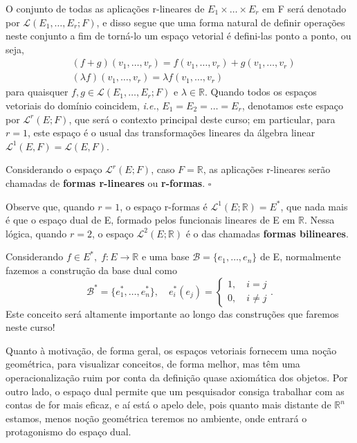 \documentclass[../differential_forms.tex]{subfiles}
\begin{document}
O conjunto de todas as aplicações r-lineares de \(E_1 \times \dotsc \times E_r\) em F será denotado por \(\mathcal{L}(E_1, \dotsc , E_r; F)\), e disso segue que uma forma natural de definir operações neste conjunto a fim de torná-lo um espaço vetorial é defini-las ponto a ponto, ou seja,
\begin{align*}
	 & (f+g)(v_1, \dotsc , v_r) = f(v_1, \dotsc , v_r) + g(v_1, \dotsc , v_r) \\
	 & (\lambda f)(v_1, \dotsc , v_r) = \lambda f(v_1,\dotsc ,v_r)
\end{align*}
para quaisquer \(f, g\in \mathcal{L}(E_1, \dotsc , E_r; F)\) e \(\lambda \in \mathbb{R}.\) Quando todos os espaços vetoriais do domínio coincidem, \textit{i.e.}, \(E_1= E_2=\dotsc=E_r\), denotamos este espaço por \(\mathcal{L}^{r}(E; F)\), que será o contexto principal deste curso; em particular, para \(r=1\), este espaço é o usual das transformações lineares da álgebra linear \(\mathcal{L}^{1}(E, F) = \mathcal{L}(E, F)\).
\begin{def*}
	Considerando o espaço \(\mathcal{L}^{r}(E; F)\), caso \(F = \mathbb{R}\), as aplicações r-lineares serão chamadas de \textbf{formas r-lineares} ou \textbf{r-formas}. \(\square\)
\end{def*}
Observe que, quando \(r=1\), o espaço r-formas é \(\mathcal{L}^{1}(E; \mathbb{R}) = E^{*}\), que nada mais é que o espaço dual de E, formado pelos funcionais lineares de E em \(\mathbb{R}\). Nessa lógica, quando \(r=2\), o espaço \(\mathcal{L}^{2}(E; \mathbb{R})\) é o das chamadas \textbf{formas bilineares}.
\begin{tcolorbox}[
		skin=enhanced,
		title=Observação,
		fonttitle=\bfseries,
		colframe=black,
		colbacktitle=cyan!75!white,
		colback=cyan!15,
		colbacklower=black,
		coltitle=black,
		drop fuzzy shadow,
	]
	Considerando \(f\in E^{*},\; f:E\rightarrow \mathbb{R}\) e uma base \(\mathcal{B} = \{e_1, \dotsc, e_n\}\) de E, normalmente fazemos a construção da base dual como
	\[
		\mathcal{B}^{*} = \{e_1^{*}, \dotsc , e_{n}^{*}\},\quad e_{i}^{*}(e_{j}) = \left\{\begin{array}{ll}
			1,\quad i=j \\
			0, \quad i\neq j
		\end{array}\right..
	\]
	Este conceito será altamente importante ao longo das construções que faremos neste curso!

	Quanto à motivação, de forma geral, os espaços vetoriais fornecem uma noção geométrica, para visualizar conceitos, de forma melhor, mas têm uma operacionalização ruim por conta da definição quase axiomática dos objetos. Por outro lado, o espaço dual permite que um pesquisador consiga trabalhar com as contas de for mais eficaz, e aí está o apelo dele, pois quanto mais distante de \(\mathbb{R}^{n}\) estamos, menos noção geométrica teremos no ambiente, onde entrará o protagonismo do espaço dual.
\end{tcolorbox}
\end{document}
